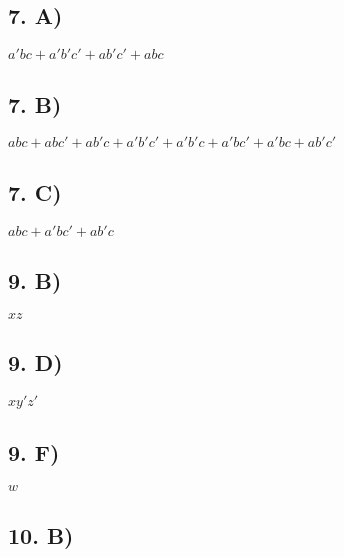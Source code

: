 \documentclass[12]{scrartcl}
\begin{document}
\subsection*{7. A)}
$a'bc + a'b'c' +ab'c' +abc$
\subsection*{7. B)}
$abc+ abc' + ab'c + a'b'c' + a'b'c + a'bc' + a'bc + ab'c′$
\subsection*{7. C)}
$abc+ a'bc' + ab'c $
\subsection*{9. B)}
$xz$
\subsection*{9. D)}
$xy'z'$
\subsection*{9. F)}
$w$
\subsection*{10. B)}
\end{document}

